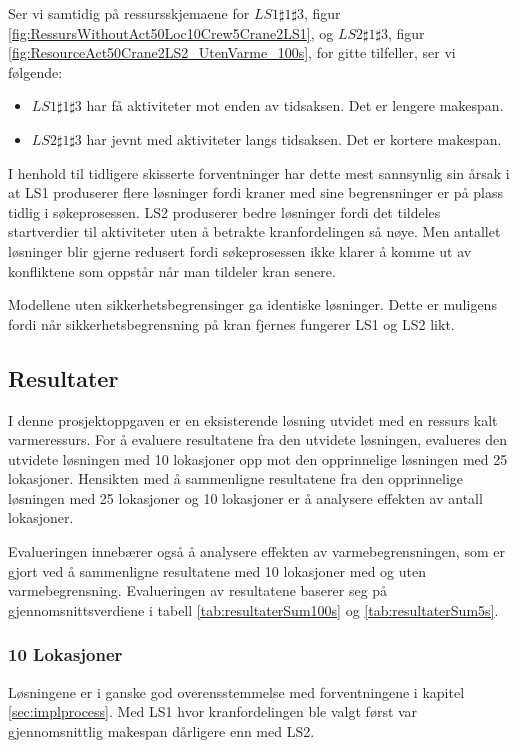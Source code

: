 Ser vi samtidig på ressursskjemaene for $LS1\sharp1\sharp3$, figur \ref{fig:RessursWithoutAct50Loc10Crew5Crane2LS1}, og $LS2\sharp1\sharp3$, figur \ref{fig:ResourceAct50Crane2LS2_UtenVarme_100s}, for gitte tilfeller, ser vi følgende:
\begin{itemize}
\item $LS1\sharp1\sharp3$ har få aktiviteter mot enden av tidsaksen. Det er lengere makespan.
\item $LS2\sharp1\sharp3$ har jevnt med aktiviteter langs tidsaksen. Det er kortere makespan.
\end{itemize}
I henhold til tidligere skisserte forventninger har dette mest sannsynlig sin årsak i at LS1 produserer flere løsninger fordi kraner med sine begrensninger er på plass tidlig i søkeprosessen.
LS2 produserer bedre løsninger fordi det tildeles startverdier til aktiviteter uten å betrakte kranfordelingen så nøye. Men antallet løsninger blir gjerne redusert fordi søkeprosessen ikke klarer å komme ut av konfliktene som oppstår når man tildeler kran senere.

Modellene uten sikkerhetsbegrensinger ga identiske løsninger. Dette er muligens fordi når sikkerhetsbegrensning på kran fjernes fungerer LS1 og LS2 likt.

\subsection{Resultater}
I denne prosjektoppgaven er en eksisterende løsning utvidet med en ressurs kalt varmeressurs. For å evaluere resultatene fra den utvidete løsningen, evalueres den utvidete løsningen med 10 lokasjoner opp mot den opprinnelige løsningen med 25 lokasjoner. Hensikten med å sammenligne resultatene fra den opprinnelige løsningen med 25 lokasjoner og 10 lokasjoner er å analysere effekten av antall lokasjoner.

Evalueringen innebærer også å analysere effekten av varmebegrensningen, som er gjort ved å sammenligne resultatene med 10 lokasjoner med og uten varmebegrensning. Evalueringen av resultatene baserer seg på gjennomsnittsverdiene i tabell \ref{tab:resultaterSum100s} og \ref{tab:resultaterSum5s}.

\subsubsection{10 Lokasjoner}
Løsningene er i ganske god overensstemmelse med forventningene i kapitel \ref{sec:implprocess}. Med LS1 hvor kranfordelingen ble valgt først var gjennomsnittlig makespan dårligere enn med LS2.


